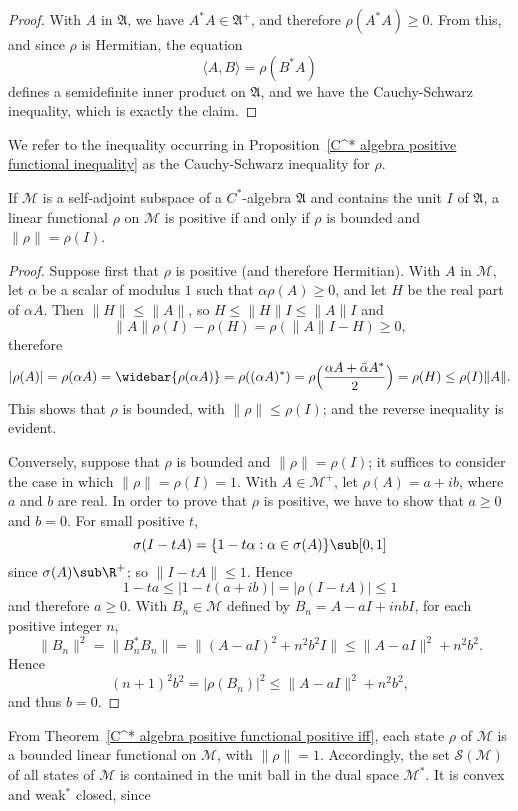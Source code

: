 \begin{proof}
With $A$ in $\mathfrak{A}$, we have $A^*A\in\mathfrak{A}^+$, and therefore $\rho(A^*A)\geq 0$. From this, and since $\rho$ is Hermitian, the equation
\[\langle A,B\rangle=\rho(B^*A)\]
defines a semidefinite inner product on $\mathfrak{A}$, and we have the Cauchy-Schwarz inequality, which is exactly the claim.
\end{proof}
We refer to the inequality occurring in Proposition~\ref{C^* algebra positive functional inequality} as the Cauchy-Schwarz inequality for $\rho$.
\begin{theorem}\label{C^* algebra positive functional positive iff}
If $\mathscr{M}$ is a self-adjoint subspace of a $C^*$-algebra $\mathfrak{A}$ and contains the unit $I$ of $\mathfrak{A}$, a linear functional $\rho$ on $\mathscr{M}$ is positive if and only if $\rho$ is bounded and $\|\rho\|=\rho(I)$.
\end{theorem}
\begin{proof}
Suppose first that $\rho$ is positive (and therefore Hermitian). With $A$ in $\mathscr{M}$, let $\alpha$ be a scalar of modulus $1$ such that $\alpha\rho(A)\geq 0$, and let $H$ be the real part of $\alpha A$. Then $\|H\|\leq\|A\|$, so $H\leq\|H\|I\leq\|A\|I$ and
\[\|A\|\rho(I)-\rho(H)=\rho(\|A\|I-H)\geq 0,\]
therefore
\begin{align*}
|\rho(A)|=\rho(\alpha A)=\widebar{\rho(\alpha A)}=\rho((\alpha A)^*)=\rho\Big(\frac{\alpha A+\bar{\alpha}A^*}{2}\Big)=\rho(H)\leq\rho(I)\|A\|.
\end{align*}
This shows that $\rho$ is bounded, with $\|\rho\|\leq\rho(I)$; and the reverse inequality is evident.\par
Conversely, suppose that $\rho$ is bounded and $\|\rho\|=\rho(I)$; it suffices to consider the case in which $\|\rho\|=\rho(I)=1$. With $A\in\mathscr{M}^+$, let $\rho(A)=a+ib$, where $a$ and $b$ are real. In order to prove that $\rho$ is positive, we have to show that $a\geq 0$ and $b=0$. For small positive $t$,
\[\sigma(I-tA)=\{1-t\alpha:\alpha\in\sigma(A)\}\sub[0,1]\]
since $\sigma(A)\sub\R^+$; so $\|I-tA\|\leq 1$. Hence
\[1-ta\leq|1-t(a+ib)|=|\rho(I-tA)|\leq 1\]
and therefore $a\geq 0$. With $B_n\in \mathscr{M}$ defined by $B_n=A-aI+inbI$, for each positive integer $n$,
\[\|B_n\|^2=\|B_n^*B_n\|=\|(A-aI)^2+n^2b^2I\|\leq\|A-aI\|^2+n^2b^2.\]
Hence
\[(n+1)^2b^2=|\rho(B_n)|^2\leq\|A-aI\|^2+n^2b^2,\]
and thus $b=0$.
\end{proof}
From Theorem~\ref{C^* algebra positive functional positive iff}, each state $\rho$ of $\mathscr{M}$ is a bounded linear functional on $\mathscr{M}$, with $\|\rho\|=1$. Accordingly, the set $\mathcal{S}(\mathscr{M})$ of all states of $\mathscr{M}$ is contained in the unit ball in the dual space $\mathscr{M}^*$. It is convex and weak$^*$ closed, since
